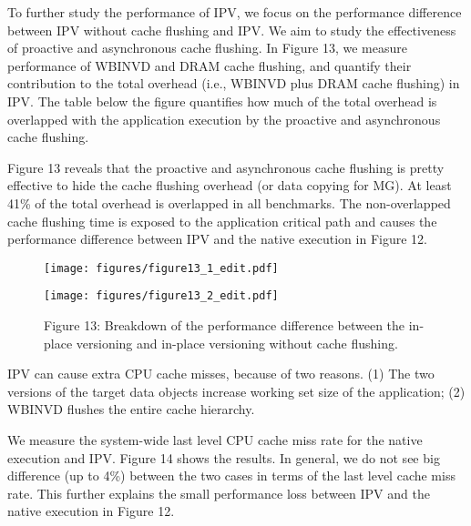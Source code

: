 To further study the performance of IPV, we focus on the performance difference between IPV without cache flushing and IPV. We aim to study the effectiveness of proactive and asynchronous cache flushing. %
In Figure 13, we measure performance of {\selectfont WBINVD} and DRAM cache flushing, and quantify their contribution
to the total overhead (i.e., {\selectfont WBINVD} plus DRAM cache flushing) in IPV.  The table below the figure quantifies how much of  the total overhead is overlapped with the application execution by the proactive and asynchronous cache flushing. 

Figure 13 reveals that the proactive and asynchronous cache flushing is pretty effective to hide the cache flushing overhead (or data copying for MG). At least 41\% of the total overhead is overlapped in all benchmarks. 
The non-overlapped cache flushing time is exposed to the application critical path and causes the performance difference between IPV and the native execution in Figure 12.

\begin{figure}
\centering
\texttt{[image: figures/figure13\_1\_edit.pdf]}

\texttt{[image: figures/figure13\_2\_edit.pdf]}
\vspace{-20pt}
\caption*{Figure 13: Breakdown of the performance difference between the in-place versioning and in-place versioning without cache flushing.}
\label{fig:ipv_perf_breakdown}
\vspace{-10pt}
\end{figure}

IPV can cause extra CPU cache misses, because of two reasons. (1) The two versions of the target data objects increase working set size of the application; (2) {\selectfont WBINVD} flushes the entire cache hierarchy. 

We measure the system-wide last level CPU cache miss rate for the native execution and IPV. Figure 14 shows the results. In general, we do not see big difference (up to 4\%) between the two cases in terms of the last level cache miss rate. This further explains the small performance loss between IPV and the native execution in Figure 12.

